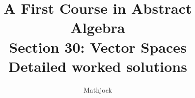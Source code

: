 
\title{\textbf{A First Course in Abstract Algebra}\\[0.3em]Section 30: Vector Spaces\\[0.3em]\large Detailed worked solutions}
\author{Mathjock}
\date{}

\maketitle
\bookinfo
\tableofcontents
\clearpage
\renewcommand{\thesection}{30}
\renewcommand{\theHsection}{fraleigh.30}


